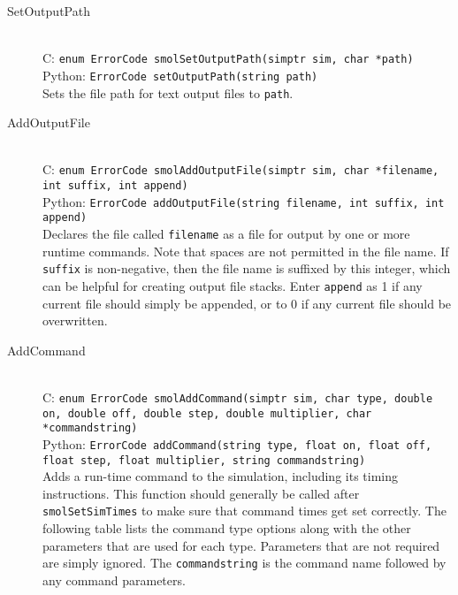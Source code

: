 \documentclass {book}
\newcommand {\ttt} {\texttt}
\begin{document}
\begin{description}

\item[SetOutputPath]
\hfill \\
C: \ttt{enum ErrorCode smolSetOutputPath(simptr sim, char *path)}\\
Python: \ttt{ErrorCode setOutputPath(string path)}\\
Sets the file path for text output files to \ttt{path}.

\item[AddOutputFile]
\hfill \\
C: \ttt{enum ErrorCode smolAddOutputFile(simptr sim, char *filename, int suffix, int append)}\\
Python: \ttt{ErrorCode addOutputFile(string filename, int suffix, int append)}\\
Declares the file called \ttt{filename} as a file for output by one or more runtime commands. Note that spaces are not permitted in the file name. If \ttt{suffix} is non-negative, then the file name is suffixed by this integer, which can be helpful for creating output file stacks. Enter \ttt{append} as 1 if any current file should simply be appended, or to 0 if any current file should be overwritten.

\item[AddCommand]
\hfill \\
C: \ttt{enum ErrorCode smolAddCommand(simptr sim, char type, double on, double off, double step, double multiplier, char *commandstring)}\\
Python: \ttt{ErrorCode addCommand(string type, float on, float off, float step, float multiplier, string commandstring)}\\
Adds a run-time command to the simulation, including its timing instructions. This function should generally be called after \ttt{smolSetSimTimes} to make sure that command times get set correctly. The following table lists the command type options along with the other parameters that are used for each type. Parameters that are not required are simply ignored. The \ttt{commandstring} is the command name followed by any command parameters.


\end{description}
\end{document}
